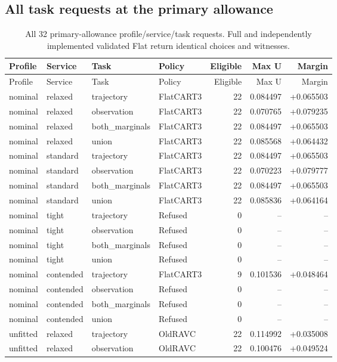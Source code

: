 \subsection{All task requests at the primary allowance}
\small\begin{longtable}{@{}llllrrr@{}}
\caption{All 32 primary-allowance profile/service/task requests. Full and independently implemented validated Flat return identical choices and witnesses.}\label{supp:requests}\\\toprule
Profile & Service & Task & Policy & Eligible & Max U & Margin\\\midrule\endfirsthead
\toprule
Profile & Service & Task & Policy & Eligible & Max U & Margin\\\midrule\endhead
nominal & relaxed & trajectory & FlatCART3 & 22 & 0.084497 & +0.065503\\
nominal & relaxed & observation & FlatCART3 & 22 & 0.070765 & +0.079235\\
nominal & relaxed & both\_marginals & FlatCART3 & 22 & 0.084497 & +0.065503\\
nominal & relaxed & union & FlatCART3 & 22 & 0.085568 & +0.064432\\
nominal & standard & trajectory & FlatCART3 & 22 & 0.084497 & +0.065503\\
nominal & standard & observation & FlatCART3 & 22 & 0.070223 & +0.079777\\
nominal & standard & both\_marginals & FlatCART3 & 22 & 0.084497 & +0.065503\\
nominal & standard & union & FlatCART3 & 22 & 0.085836 & +0.064164\\
nominal & tight & trajectory & Refused & 0 & -- & --\\
nominal & tight & observation & Refused & 0 & -- & --\\
nominal & tight & both\_marginals & Refused & 0 & -- & --\\
nominal & tight & union & Refused & 0 & -- & --\\
nominal & contended & trajectory & FlatCART3 & 9 & 0.101536 & +0.048464\\
nominal & contended & observation & Refused & 0 & -- & --\\
nominal & contended & both\_marginals & Refused & 0 & -- & --\\
nominal & contended & union & Refused & 0 & -- & --\\
unfitted & relaxed & trajectory & OldRAVC & 22 & 0.114992 & +0.035008\\
unfitted & relaxed & observation & OldRAVC & 22 & 0.100476 & +0.049524\\

\end{longtable}

